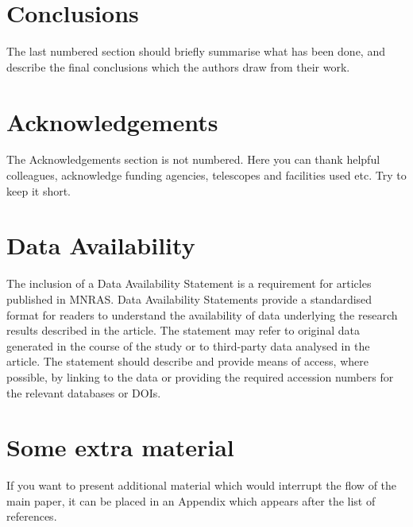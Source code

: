 \documentclass[fleqn,usenatbib]{mnras}
\begin{document}
\section{Conclusions}

The last numbered section should briefly summarise what has been done, and describe
the final conclusions which the authors draw from their work.

\section*{Acknowledgements}

The Acknowledgements section is not numbered. Here you can thank helpful
colleagues, acknowledge funding agencies, telescopes and facilities used etc.
Try to keep it short.

\section*{Data Availability}

 
The inclusion of a Data Availability Statement is a requirement for articles published in MNRAS. Data Availability Statements provide a standardised format for readers to understand the availability of data underlying the research results described in the article. The statement may refer to original data generated in the course of the study or to third-party data analysed in the article. The statement should describe and provide means of access, where possible, by linking to the data or providing the required accession numbers for the relevant databases or DOIs.












\appendix

\section{Some extra material}

If you want to present additional material which would interrupt the flow of the main paper,
it can be placed in an Appendix which appears after the list of references.



\bsp	%
\label{lastpage}
\end{document}

